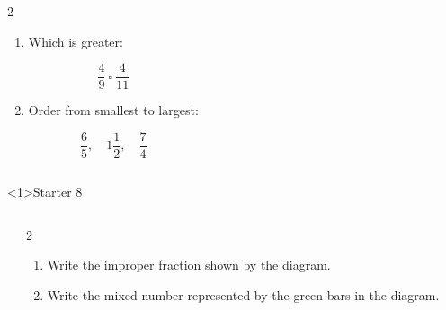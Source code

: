 \documentclass{beamer}
\newcommand{\ashow}[1]{\uncover<2->{\textcolor{red}{\small #1}}}
\begin{document}
\begin{frame}
\begin{columns}
\begin{multicols}{2}
\begin{enumerate}
\item Which is greater:

\[
\frac{4}{9}\ \square\ \frac{4}{11}
\]
\ashow{$\frac{4}{9}$}

\item Order from smallest to largest:

\[
\frac{6}{5},\quad 1\frac{1}{2},\quad \frac{7}{4}
\]
\ashow{$\frac{6}{5},\ 1\frac{1}{2},\ \frac{7}{4}$}

\end{enumerate}

\end{multicols}

\end{columns}

\end{frame}
\begin{frame}<1>{Starter 8}

\vspace{-2.5em}

\begin{columns}


\begin{center}
\end{center}


\small
\begin{multicols}{2}

\begin{enumerate}

\item Write the improper fraction shown by the diagram. \ashow{$\frac{5}{4}$}

\item Write the mixed number represented by the green bars in the diagram. \ashow{$1\frac{1}{4}$}


\end{enumerate}
\end{multicols}
\end{columns}
\end{frame}
\end{document}
